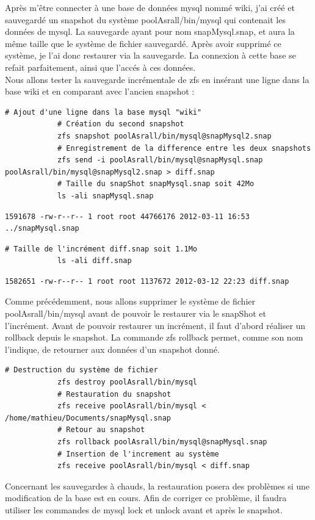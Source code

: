 \documentclass[a4paper]{report}
\begin{document}
		Après m'être connecter à une base de données mysql nommé wiki, j'ai créé et sauvegardé un snapshot du système poolAsrall/bin/mysql qui contenait les données de mysql. La sauvegarde ayant pour nom snapMysql.snap, et aura la même taille que le système de fichier sauvegardé. Après avoir supprimé ce système, je l'ai donc restaurer via la sauvegarde. La connexion à cette base se refait parfaitement, ainsi que l'accés à ces données. \\
		Nous allons tester la sauvegarde incrémentale de zfs en insérant une ligne dans la base wiki et en comparant avec l'ancien snapshot :\\
		\begin{lstlisting}[language=ksh,texcl]
			# Ajout d'une ligne dans la base mysql "wiki"
			# Création du second snapshot
			zfs snapshot poolAsrall/bin/mysql@snapMysql2.snap
			# Enregistrement de la difference entre les deux snapshots
			zfs send -i poolAsrall/bin/mysql@snapMysql.snap poolAsrall/bin/mysql@snapMysql2.snap > diff.snap
			# Taille du snapShot snapMysql.snap soit 42Mo
			ls -ali snapMysql.snap
		\end{lstlisting}
		\begin{lstlisting}[backgroundcolor=\color{yellow}]
			1591678 -rw-r--r-- 1 root root 44766176 2012-03-11 16:53 ../snapMysql.snap
		\end{lstlisting}
		\begin{lstlisting}[language=ksh,texcl]
			# Taille de l'incrément diff.snap soit 1.1Mo
			ls -ali diff.snap
		\end{lstlisting}
		\begin{lstlisting}[backgroundcolor=\color{yellow}]
			1582651 -rw-r--r-- 1 root root 1137672 2012-03-12 22:23 diff.snap
		\end{lstlisting}
		Comme précédemment, nous allons supprimer le système de fichier poolAsrall/bin/mysql avant de pouvoir le restaurer via le snapShot et l'incrément. Avant de pouvoir restaurer un incrément, il faut d'abord réaliser un rollback depuis le snapshot. La commande zfs rollback permet, comme son nom l'indique, de retourner aux données d'un snapshot donné.
		\begin{lstlisting}[language=ksh,texcl]
			# Destruction du système de fichier
			zfs destroy poolAsrall/bin/mysql
			# Restauration du snapshot
			zfs receive poolAsrall/bin/mysql < /home/mathieu/Documents/snapMysql.snap
			# Retour au snapshot
			zfs rollback poolAsrall/bin/mysql@snapMysql.snap
			# Insertion de l'increment au système
			zfs receive poolAsrall/bin/mysql < diff.snap
		\end{lstlisting}
		Concernant les sauvegardes à chauds, la restauration posera des problèmes si une modification de la base est en cours. Afin de corriger ce problème, il faudra utiliser les commandes de mysql lock et unlock avant et après le snapshot.
\end{document}
